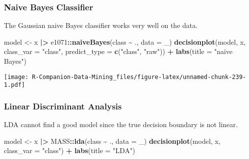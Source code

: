 \documentclass[
  notitlepage]{book}
\newenvironment{Shaded}{\begin{snugshade}}{\end{snugshade}}
\newcommand{\DataTypeTok}[1]{\textcolor[rgb]{0.13,0.29,0.53}{#1}}
\newcommand{\ErrorTok}[1]{\textcolor[rgb]{0.64,0.00,0.00}{\textbf{#1}}}
\newcommand{\KeywordTok}[1]{\textcolor[rgb]{0.13,0.29,0.53}{\textbf{#1}}}
\newcommand{\NormalTok}[1]{#1}
\newcommand{\OperatorTok}[1]{\textcolor[rgb]{0.81,0.36,0.00}{\textbf{#1}}}
\newcommand{\StringTok}[1]{\textcolor[rgb]{0.31,0.60,0.02}{#1}}
\begin{document}
\hypertarget{naive-bayes-classifier-2}{%
\subsubsection{Naive Bayes Classifier}\label{naive-bayes-classifier-2}}

The Gaussian naive Bayes classifier works very well on the data.

\begin{Shaded}
\begin{Highlighting}[]
\NormalTok{model \textless{}{-}}\StringTok{ }\NormalTok{x }\OperatorTok{|}\ErrorTok{\textgreater{}}\StringTok{ }\NormalTok{e1071}\OperatorTok{::}\KeywordTok{naiveBayes}\NormalTok{(class }\OperatorTok{\textasciitilde{}}\StringTok{ }\NormalTok{., }\DataTypeTok{data =}\NormalTok{ \_)}
\KeywordTok{decisionplot}\NormalTok{(model, x, }\DataTypeTok{class\_var =} \StringTok{"class"}\NormalTok{, }
  \DataTypeTok{predict\_type =} \KeywordTok{c}\NormalTok{(}\StringTok{"class"}\NormalTok{, }\StringTok{"raw"}\NormalTok{)) }\OperatorTok{+}\StringTok{ }
\StringTok{  }\KeywordTok{labs}\NormalTok{(}\DataTypeTok{title =} \StringTok{"naive Bayes"}\NormalTok{)}
\end{Highlighting}
\end{Shaded}

\texttt{[image: R-Companion-Data-Mining\_files/figure-latex/unnamed-chunk-239-1.pdf]}

\hypertarget{linear-discriminant-analysis-1}{%
\subsubsection{Linear Discriminant Analysis}\label{linear-discriminant-analysis-1}}

LDA cannot find a good model since the true decision boundary is not
linear.

\begin{Shaded}
\begin{Highlighting}[]
\NormalTok{model \textless{}{-}}\StringTok{ }\NormalTok{x }\OperatorTok{|}\ErrorTok{\textgreater{}}\StringTok{ }\NormalTok{MASS}\OperatorTok{::}\KeywordTok{lda}\NormalTok{(class }\OperatorTok{\textasciitilde{}}\StringTok{ }\NormalTok{., }\DataTypeTok{data =}\NormalTok{ \_)}
\KeywordTok{decisionplot}\NormalTok{(model, x, }\DataTypeTok{class\_var =} \StringTok{"class"}\NormalTok{) }\OperatorTok{+}\StringTok{ }\KeywordTok{labs}\NormalTok{(}\DataTypeTok{title =} \StringTok{"LDA"}\NormalTok{)}
\end{Highlighting}
\end{Shaded}
\end{document}
